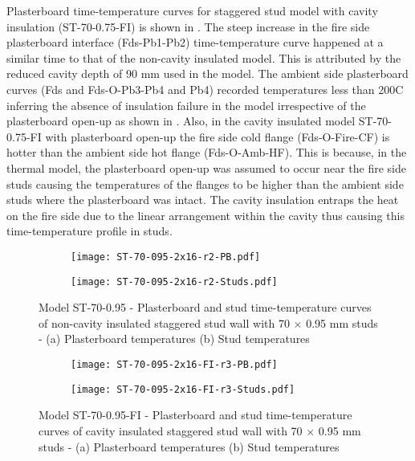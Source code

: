 Plasterboard time-temperature curves for staggered stud model with cavity insulation (ST-70-0.75-FI) is shown in . The steep increase in the fire side plasterboard interface (Fds-Pb1-Pb2) time-temperature curve happened at a similar time to that of the non-cavity insulated model. This is attributed by the reduced cavity depth of 90 mm used in the model. The ambient side plasterboard curves (Fds and Fds-O-Pb3-Pb4 and Pb4) recorded temperatures less than 200\degree C inferring the absence of insulation failure in the model irrespective of the plasterboard open-up as shown in . Also, in the cavity insulated model ST-70-0.75-FI with plasterboard open-up the fire side cold flange (Fds-O-Fire-CF) is hotter than the ambient side hot flange (Fds-O-Amb-HF). This is because, in the thermal model, the plasterboard open-up was assumed to occur near the fire side studs causing the temperatures of the flanges to be higher than the ambient side studs where the plasterboard was intact. The cavity insulation entraps the heat on the fire side due to the linear arrangement within the cavity thus causing this time-temperature profile in studs.
\begin{figure}[!htbp]
	\centering
	\begin{subfigure}[b]{0.6\textwidth}
		\centering
		\texttt{[image: ST-70-095-2x16-r2-PB.pdf]}
		\caption{}
		\label{subfig:ST-70-095-2x16-r2-PB}
	\end{subfigure}
	\begin{subfigure}[b]{0.6\textwidth}
		\centering
		\texttt{[image: ST-70-095-2x16-r2-Studs.pdf]}
		\caption{}
		\label{subfig:ST-70-095-2x16-r2-Studs}
	\end{subfigure}
	   \caption{Model ST-70-0.95 - Plasterboard and stud time-temperature curves of non-cavity insulated staggered stud wall with 70 $\times$ 0.95 mm studs - (a) Plasterboard temperatures (b) Stud temperatures}
	   \label{fig:ST-70-095-2x16-r2}
\end{figure}
\begin{figure}[!htbp]
	\centering
	\begin{subfigure}[b]{0.6\textwidth}
		\centering
		\texttt{[image: ST-70-095-2x16-FI-r3-PB.pdf]}
		\caption{}
		\label{subfig:ST-70-095-2x16-FI-r3-PB}
	\end{subfigure}
	\begin{subfigure}[b]{0.6\textwidth}
		\centering
		\texttt{[image: ST-70-095-2x16-FI-r3-Studs.pdf]}
		\caption{}
		\label{subfig:ST-70-095-2x16-FI-r3-Studs}
	\end{subfigure}
	   \caption{Model ST-70-0.95-FI - Plasterboard and stud time-temperature curves of cavity insulated staggered stud wall with 70 $\times$ 0.95 mm studs - (a) Plasterboard temperatures (b) Stud temperatures}
	   \label{fig:ST-70-095-2x16-FI-r3}
\end{figure}


